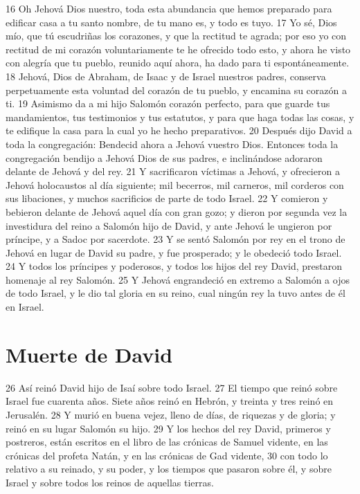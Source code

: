 16 Oh Jehová Dios nuestro, toda esta abundancia que hemos preparado para edificar casa a tu santo nombre, de tu mano es, y todo es tuyo.
17 Yo sé, Dios mío, que tú escudriñas los corazones, y que la rectitud te agrada; por eso yo con rectitud de mi corazón voluntariamente te he ofrecido todo esto, y ahora he visto con alegría que tu pueblo, reunido aquí ahora, ha dado para ti espontáneamente.
18 Jehová, Dios de Abraham, de Isaac y de Israel nuestros padres, conserva perpetuamente esta voluntad del corazón de tu pueblo, y encamina su corazón a ti.
19 Asimismo da a mi hijo Salomón corazón perfecto, para que guarde tus mandamientos, tus testimonios y tus estatutos, y para que haga todas las cosas, y te edifique la casa para la cual yo he hecho preparativos.
20 Después dijo David a toda la congregación: Bendecid ahora a Jehová vuestro Dios. Entonces toda la congregación bendijo a Jehová Dios de sus padres, e inclinándose adoraron delante de Jehová y del rey.
21 Y sacrificaron víctimas a Jehová, y ofrecieron a Jehová holocaustos al día siguiente; mil becerros, mil carneros, mil corderos con sus libaciones, y muchos sacrificios de parte de todo Israel.
22 Y comieron y bebieron delante de Jehová aquel día con gran gozo; y dieron por segunda vez la investidura del reino a Salomón hijo de David, y ante Jehová le ungieron por príncipe, y a Sadoc por sacerdote.
23 Y se sentó Salomón por rey en el trono de Jehová en lugar de David su padre, y fue prosperado; y le obedeció todo Israel.
24 Y todos los príncipes y poderosos, y todos los hijos del rey David, prestaron homenaje al rey Salomón.
25 Y Jehová engrandeció en extremo a Salomón a ojos de todo Israel, y le dio tal gloria en su reino, cual ningún rey la tuvo antes de él en Israel.
\section*{Muerte de David}

26 Así reinó David hijo de Isaí sobre todo Israel.
27 El tiempo que reinó sobre Israel fue cuarenta años. Siete años reinó en Hebrón, y treinta y tres reinó en Jerusalén. 
28 Y murió en buena vejez, lleno de días, de riquezas y de gloria; y reinó en su lugar Salomón su hijo.
29 Y los hechos del rey David, primeros y postreros, están escritos en el libro de las crónicas de Samuel vidente, en las crónicas del profeta Natán, y en las crónicas de Gad vidente,
30 con todo lo relativo a su reinado, y su poder, y los tiempos que pasaron sobre él, y sobre Israel y sobre todos los reinos de aquellas tierras.

